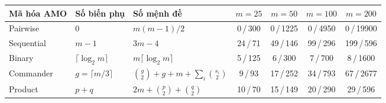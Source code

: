 \begin{tabular}{lllcccc}
\toprule
Mã hóa AMO & Số biến phụ & Số mệnh đề & $m=25$ & $m=50$ & $m=100$ & $m=200$ \\
\midrule
Pairwise & $0$ & $m(m-1)/2$ & 0\,/\,300 & 0\,/\,1225 & 0\,/\,4950 & 0\,/\,19900 \\
Sequential & $m-1$ & $3m-4$ & 24\,/\,71 & 49\,/\,146 & 99\,/\,296 & 199\,/\,596 \\
Binary & $\lceil\log_2 m\rceil$ & $m\lceil\log_2 m\rceil$ & 5\,/\,125 & 6\,/\,300 & 7\,/\,700 & 8\,/\,1600 \\
Commander & $g=\lceil m/3\rceil$ & $\binom{g}{2}+g+m+\sum_i\binom{s_i}{2}$ & 9\,/\,93 & 17\,/\,252 & 34\,/\,793 & 67\,/\,2677 \\
Product & $p+q$ & $2m+\binom{p}{2}+\binom{q}{2}$ & 10\,/\,70 & 15\,/\,149 & 20\,/\,290 & 29\,/\,596 \\
\bottomrule
\end{tabular}
